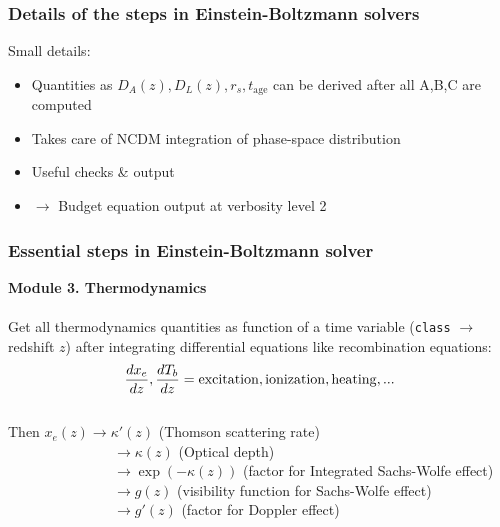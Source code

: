 \begin{frame}[fragile]

\end{frame}


\begin{frame}[fragile]
	\frametitle{Details of the steps in Einstein-Boltzmann solvers}

	Small details:
	\begin{itemize}
		\item Quantities as $D_A(z), D_L(z), r_s, t_\mathrm{age}$ can be derived after all A,B,C are computed
		\item Takes care of NCDM integration of phase-space distribution
		\item Useful checks \& output
		\item $\to$ Budget equation output at verbosity level 2
	\end{itemize}
	
\end{frame}



\begin{frame}[fragile]
\frametitle{Essential steps in Einstein-Boltzmann solver}

{\bf Module 3. Thermodynamics}\\
\mbox{}\\
Get all thermodynamics quantities as function of a time variable ({\tt \Red class} $\rightarrow$ redshift $z$) after integrating differential equations like recombination equations:
$$
\frac{d x_e}{dz} , \frac{d T_b}{dz}= {\rm excitation}, {\rm ionization}, {\rm heating}, ... 
$$
\vspace{-0.5cm}\\
Then $x_e(z) \rightarrow \kappa'(z)$ (Thomson scattering rate)\\
~~~~~~~~~~~~~~~$\rightarrow \kappa(z)$ (Optical depth)\\
~~~~~~~~~~~~~~~$\rightarrow \exp(-\kappa(z))$ (factor for Integrated Sachs-Wolfe effect)\\
~~~~~~~~~~~~~~~$\rightarrow g(z)$ (visibility function for Sachs-Wolfe effect)\\
~~~~~~~~~~~~~~~$\rightarrow g'(z)$ (factor for Doppler effect)\\

\end{frame}



